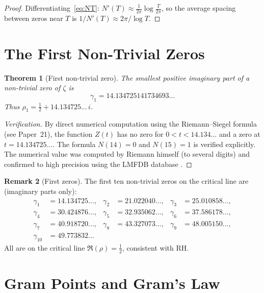 \documentclass[12pt,a4paper]{amsart}
\newtheorem{theorem}{Theorem}[section]
\theoremstyle{definition}
\newtheorem{remark}[theorem]{Remark}
\begin{document}
\begin{proof}
Differentiating~\eqref{eq:NT}: $N'(T) \approx \frac{1}{2\pi}\log\frac{T}{2\pi}$,
so the average spacing between zeros near $T$ is $1/N'(T) \approx 2\pi/\log T$.
\end{proof}

\section{The First Non-Trivial Zeros}

\begin{theorem}[First non-trivial zero]
\label{thm:first_zero}
The smallest positive imaginary part of a non-trivial zero of $\zeta$ is
\[
  \gamma_1 = 14.134725141734693\ldots
\]
Thus $\rho_1 = \tfrac{1}{2} + 14.134725\ldots\,i$.
\end{theorem}

\begin{proof}[Verification]
By direct numerical computation using the Riemann--Siegel formula
(see Paper~21), the function $Z(t)$ has no zero for $0 < t < 14.134\ldots$
and a zero at $t = 14.134725\ldots$.
The formula $N(14) = 0$ and $N(15) = 1$ is verified explicitly.
The numerical value was computed by Riemann himself (to several digits)
and confirmed to high precision using the LMFDB database \cite{LMFDB}.
\end{proof}

\begin{remark}[First zeros]
The first ten non-trivial zeros on the critical line are
(imaginary parts only):
\begin{align*}
  \gamma_1 &= 14.134725\ldots, &
  \gamma_2 &= 21.022040\ldots, &
  \gamma_3 &= 25.010858\ldots, \\
  \gamma_4 &= 30.424876\ldots, &
  \gamma_5 &= 32.935062\ldots, &
  \gamma_6 &= 37.586178\ldots, \\
  \gamma_7 &= 40.918720\ldots, &
  \gamma_8 &= 43.327073\ldots, &
  \gamma_9 &= 48.005150\ldots, \\
  \gamma_{10} &= 49.773832\ldots
\end{align*}
All are on the critical line $\Re(\rho) = \tfrac{1}{2}$, consistent with RH.
\end{remark}

\section{Gram Points and Gram's Law}
\end{document}
